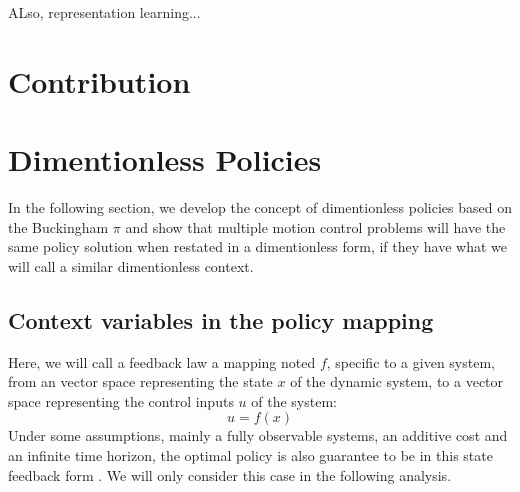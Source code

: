 ALso, representation learning...


\section{Contribution}








\section{Dimentionless Policies}
\label{sec:dimenanalysis}

In the following section, we develop the concept of dimentionless policies based on the Buckingham $\pi$ and show that multiple motion control problems will have the same policy solution when restated in a dimentionless form, if they have what we will call a similar dimentionless context.

\subsection{Context variables in the policy mapping}

Here, we will call a feedback law a mapping noted $f$, specific to a given system, from an vector space representing the state $x$ of the dynamic system, to a vector space representing the control inputs $u$ of the system:
\begin{equation}
u
=
f \left(
x
\right)
\end{equation}
Under some assumptions, mainly a fully observable systems, an additive cost and an infinite time horizon, the optimal policy is also guarantee to be in this state feedback form \cite{bertsekas_dynamic_2012}. We will only consider this case in the following analysis.

